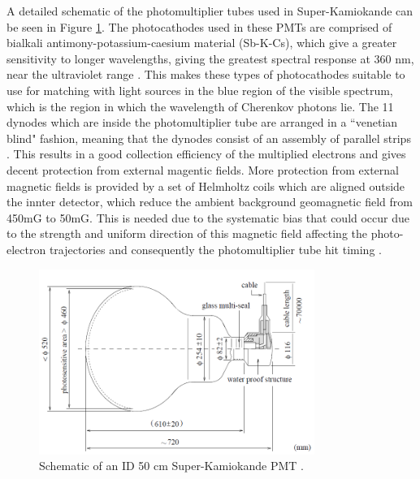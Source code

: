 A detailed schematic of the photomultiplier tubes used in Super-Kamiokande can be seen in Figure \ref{fig:PMTdiagram}. The photocathodes used in these PMTs are comprised of bialkali antimony-potassium-caesium material (Sb-K-Cs), which give a greater sensitivity to longer wavelengths, giving the greatest spectral response at 360 nm, near the ultraviolet range \cite{vukolov2015portable}. This makes these types of photocathodes suitable to use for matching with light sources in the blue region of the visible spectrum, which is the region in which the wavelength of Cherenkov photons lie. The 11 dynodes which are inside the photomultiplier tube are arranged in a ``venetian blind" fashion, meaning that the dynodes consist of an assembly of parallel strips \cite{van1972experimental}. This results in a good collection efficiency of the multiplied electrons and gives decent protection from external magentic fields. More protection from external magnetic fields is provided by a set of Helmholtz coils which are aligned outside the innter detector, which reduce the ambient background geomagnetic field from 450mG to 50mG. This is needed due to the systematic bias that could occur due to the strength and uniform direction of this magnetic field affecting the photo-electron trajectories and consequently the photomultiplier tube hit timing \cite{brack2013characterization}. 

\begin{figure}
    \centering
    \includegraphics[width=0.8\textwidth]{Figures/PMT_schematic.png}
\caption{Schematic of an ID 50 cm Super-Kamiokande PMT \cite{fukuda_super-kamiokande_2003}.}
    \label{fig:PMTdiagram}
\end{figure}


